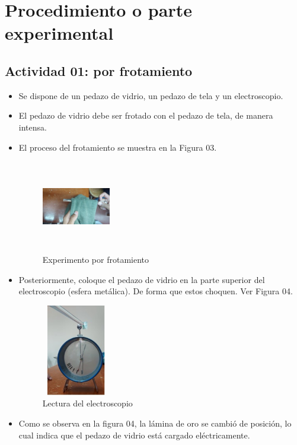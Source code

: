\section{Procedimiento o parte experimental}
\subsection{Actividad 01: por frotamiento}
\begin{itemize}
	\item Se dispone de un pedazo de vidrio, un pedazo de tela y un electroscopio. 
	\item El pedazo de vidrio debe ser frotado con el pedazo de tela, de manera intensa.
	\item El proceso del frotamiento se muestra en la Figura 03. 
	\begin{figure}[h]
		\centering
		\includegraphics[width=3cm, height=4cm]{imagenes/porfrotamiento.jpg}
		\caption{Experimento por frotamiento}
	\end{figure}
	\item Posteriormente, coloque el pedazo de vidrio en la parte superior del electroscopio (esfera metálica). De forma que estos choquen. Ver Figura 04.
	\begin{figure}[h]
		\centering
		\includegraphics[width=3cm, height=4cm]{imagenes/lecturadeelctrometro.jpg}
		\caption{Lectura del electroscopio}
	\end{figure} 
	\item Como se observa en la figura 04, la lámina de oro se cambió de posición, lo cual indica que el pedazo de vidrio está cargado eléctricamente.
\end{itemize}

